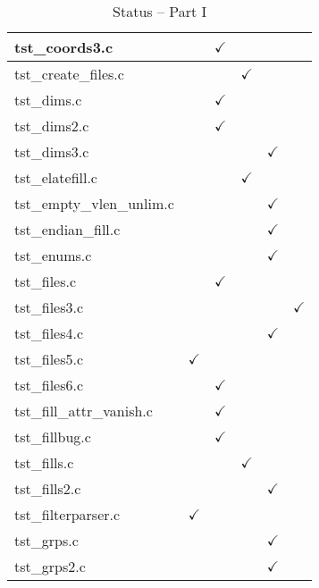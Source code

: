 \begin{table}[H]
\begin{tabular}{|l|c|c|c|c|c|}
tst\_coords3.c    &   & $\checkmark$  &   &   &   \\ \hline
tst\_create\_files.c   &   &   & $\checkmark$  &   &   \\ \hline
tst\_dims.c       &   & $\checkmark$  &   &   &   \\ \hline
tst\_dims2.c      &   & $\checkmark$  &   &   &   \\ \hline
tst\_dims3.c      &   &   &   & $\checkmark$  &   \\ \hline
tst\_elatefill.c  &   &   & $\checkmark$  &   &   \\ \hline
tst\_empty\_vlen\_unlim.c   &   &   &   & $\checkmark$  &   \\ \hline
tst\_endian\_fill.c   &   &   &   & $\checkmark$  &   \\ \hline
tst\_enums.c   &   &   &   &  $\checkmark$ &   \\ \hline
tst\_files.c   &   & $\checkmark$  &   &   &   \\ \hline
tst\_files3.c   &   &   &   &   &  $\checkmark$ \\ \hline
tst\_files4.c   &   &   &   & $\checkmark$  &   \\ \hline
tst\_files5.c   & $\checkmark$  &   &   &   &   \\ \hline
tst\_files6.c   &   & $\checkmark$  &   &   &   \\ \hline
tst\_fill\_attr\_vanish.c   &   & $\checkmark$  &   &   &   \\ \hline
tst\_fillbug.c   &   & $\checkmark$  &   &   &   \\ \hline
tst\_fills.c   &   &   &  $\checkmark$ &   &   \\ \hline
tst\_fills2.c   &   &   &   & $\checkmark$  &   \\ \hline
tst\_filterparser.c   & $\checkmark$  &   &   &   &   \\ \hline
tst\_grps.c   &   &   &   &  $\checkmark$ &   \\ \hline
tst\_grps2.c   &   &   &   & $\checkmark$  &   \\ \hline
\hline
\end{tabular}
\caption{Status -- Part I}
\end{table}

\clearpage

